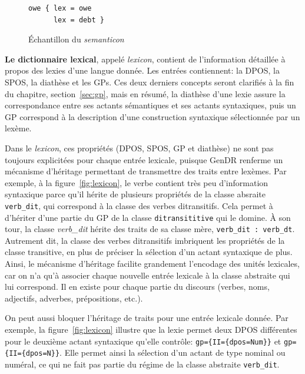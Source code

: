 \begin{figure}
  \caption{Échantillon du \emph{semanticon}}
	\label{fig:semanticon}
\begin{lstlisting}[language=mate]
owe { lex = owe
      lex = debt }
\end{lstlisting}
\end{figure}

\textbf{Le dictionnaire lexical}, appelé \emph{lexicon}, contient de l'information détaillée à propos des lexies d'une langue donnée. Les entrées contiennent: la \ac{DPOS}, la \ac{SPOS}, la diathèse et les \acp{GP}. Ces deux derniers concepts seront clarifiés à la fin du chapitre, section~\ref{sec:gp}, mais en résumé, la diathèse d'une lexie assure la correspondance entre ses actants sémantiques et ses actants syntaxiques, puis un \ac{GP} correspond à la description d'une construction syntaxique sélectionnée par un lexème.

Dans le \emph{lexicon}, ces propriétés (\ac{DPOS}, \ac{SPOS}, \ac{GP} et diathèse) ne sont pas toujours explicitées pour chaque entrée lexicale, puisque GenDR renferme un mécanisme d'héritage permettant de transmettre des traits entre lexèmes. Par exemple, à la figure~\ref{fig:lexicon}, le verbe  contient très peu d'information syntaxique parce qu'il hérite de plusieurs propriétés de la classe absraite \texttt{verb\_dit}, qui correspond à la classe des verbes ditransitifs. Cela permet à  d'hériter d'une partie du \ac{GP} de la classe \lstinline|ditransititive| qui le domine. À son tour, la classe \emph{verb\_dit} hérite des traits de sa classe mère, \lstinline|verb_dit : verb_dt|. Autrement dit, la classe des verbes ditransitifs imbriquent les propriétés de la classe transitive, en plus de préciser la sélection d'un actant syntaxique de plus. Ainsi, le mécanisme d'héritage facilite grandement l'encodage des unités lexicales, car on n'a qu'à associer chaque nouvelle entrée lexicale à la classe abstraite qui lui correspond. Il en existe pour chaque partie du discours (verbes, noms, adjectifs, adverbes, prépositions, etc.).

On peut aussi bloquer l'héritage de traits pour une entrée lexicale donnée. Par exemple, la figure~\ref{fig:lexicon} illustre que la lexie  permet deux \ac{DPOS} différentes pour le deuxième actant syntaxique qu'elle contrôle: \lstinline!gp={II={dpos=Num}}! et \lstinline!gp={II={dpos=N}}!. Elle permet ainsi la sélection d'un actant de type nominal ou numéral, ce qui ne fait pas partie du régime de la classe abstraite \texttt{verb\_dit}.

